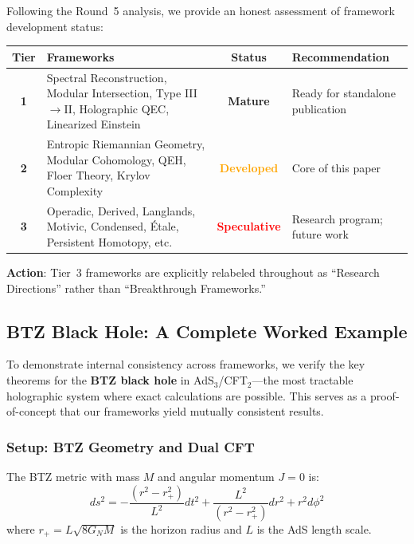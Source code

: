 \documentclass[12pt,a4paper]{article}
\begin{document}
Following the Round~5 analysis, we provide an honest assessment of framework development status:

\begin{center}
\small
\renewcommand{\arraystretch}{1.2}
\begin{tabular}{|c|p{4.5cm}|c|p{4.5cm}|}
\hline
\textbf{Tier} & \textbf{Frameworks} & \textbf{Status} & \textbf{Recommendation} \\
\hline
\textbf{1} & Spectral Reconstruction, Modular Intersection, Type III$\to$II, Holographic QEC, Linearized Einstein & \textcolor{green!50!black}{\textbf{Mature}} & Ready for standalone publication \\
\hline
\textbf{2} & Entropic Riemannian Geometry, Modular Cohomology, QEH, Floer Theory, Krylov Complexity & \textcolor{orange}{\textbf{Developed}} & Core of this paper \\
\hline
\textbf{3} & Operadic, Derived, Langlands, Motivic, Condensed, \'Etale, Persistent Homotopy, etc. & \textcolor{red}{\textbf{Speculative}} & Research program; future work \\
\hline
\end{tabular}
\end{center}

\noindent\textbf{Action}: Tier~3 frameworks are explicitly relabeled throughout as ``Research Directions'' rather than ``Breakthrough Frameworks.''

\subsection{BTZ Black Hole: A Complete Worked Example}
\label{subsec:btz-complete-example}

To demonstrate internal consistency across frameworks, we verify the key theorems for the \textbf{BTZ black hole} in AdS$_3$/CFT$_2$---the most tractable holographic system where exact calculations are possible. This serves as a proof-of-concept that our frameworks yield mutually consistent results.

\subsubsection{Setup: BTZ Geometry and Dual CFT}

The BTZ metric with mass $M$ and angular momentum $J = 0$ is:
\begin{equation}
ds^2 = -\frac{(r^2 - r_+^2)}{L^2} dt^2 + \frac{L^2}{(r^2 - r_+^2)} dr^2 + r^2 d\phi^2
\end{equation}
where $r_+ = L\sqrt{8G_N M}$ is the horizon radius and $L$ is the AdS length scale.
\end{document}
